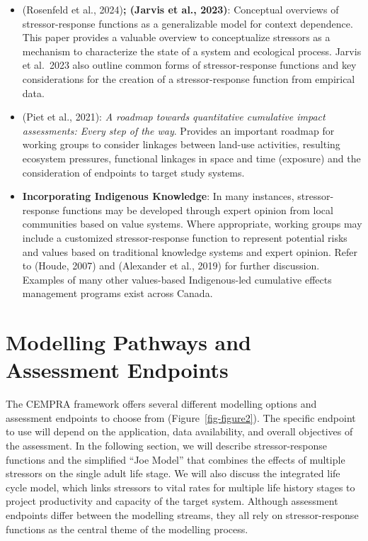 \documentclass[
  letterpaper,
  DIV=11,
  numbers=noendperiod]{scrreprt}
\providecommand{\tightlist}{%
  \setlength{\itemsep}{0pt}\setlength{\parskip}{0pt}}\usepackage{longtable,booktabs,array}
\begin{document}
\begin{itemize}
\tightlist
\item
  (Rosenfeld et al., 2024)\textbf{; (Jarvis et al., 2023)}: Conceptual
  overviews of stressor-response functions as a generalizable model for
  context dependence. This paper provides a valuable overview to
  conceptualize stressors as a mechanism to characterize the state of a
  system and ecological process. Jarvis et al.~2023 also outline common
  forms of stressor-response functions and key considerations for the
  creation of a stressor-response function from empirical data.
\item
  (Piet et al., 2021): \emph{A roadmap towards quantitative cumulative
  impact assessments: Every step of the way}. Provides an important
  roadmap for working groups to consider linkages between land-use
  activities, resulting ecosystem pressures, functional linkages in
  space and time (exposure) and the consideration of endpoints to target
  study systems.
\item
  \textbf{Incorporating Indigenous Knowledge}: In many instances,
  stressor-response functions may be developed through expert opinion
  from local communities based on value systems. Where appropriate,
  working groups may include a customized stressor-response function to
  represent potential risks and values based on traditional knowledge
  systems and expert opinion. Refer to (Houde, 2007) and (Alexander et
  al., 2019) for further discussion. Examples of many other values-based
  Indigenous-led cumulative effects management programs exist across
  Canada.
\end{itemize}


\hypertarget{modelling-pathways-and-assessment-endpoints}{%
\chapter{Modelling Pathways and Assessment
Endpoints}\label{modelling-pathways-and-assessment-endpoints}}

The CEMPRA framework offers several different modelling options and
assessment endpoints to choose from (Figure~\ref{fig-figure2}). The
specific endpoint to use will depend on the application, data
availability, and overall objectives of the assessment. In the following
section, we will describe stressor-response functions and the simplified
``Joe Model'' that combines the effects of multiple stressors on the
single adult life stage. We will also discuss the integrated life cycle
model, which links stressors to vital rates for multiple life history
stages to project productivity and capacity of the target system.
Although assessment endpoints differ between the modelling streams, they
all rely on stressor-response functions as the central theme of the
modelling process.
\end{document}

